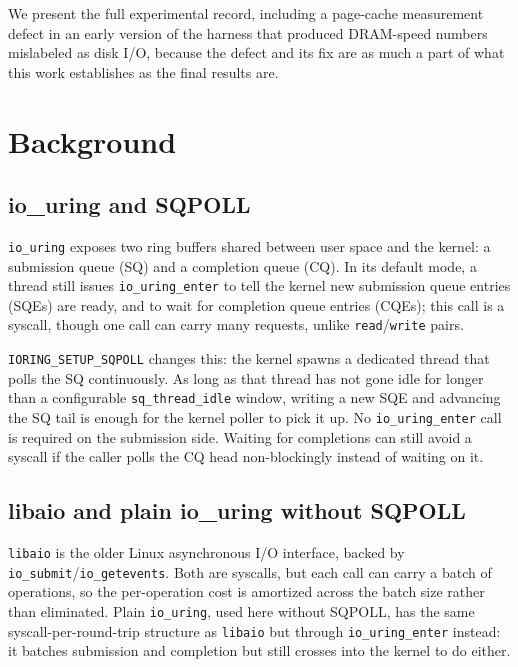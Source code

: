 \documentclass[conference]{IEEEtran}
\begin{document}
We present the full experimental record, including a page-cache measurement defect in an early
version of the harness that produced DRAM-speed numbers mislabeled as disk I/O, because the
defect and its fix are as much a part of what this work establishes as the final results are.

\section{Background}

\subsection{io\_uring and SQPOLL}

\texttt{io\_uring} exposes two ring buffers shared between user space and the kernel: a
submission queue (SQ) and a completion queue (CQ). In its default mode, a thread still issues
\texttt{io\_uring\_enter} to tell the kernel new submission queue entries (SQEs) are ready, and
to wait for completion queue entries (CQEs); this call is a syscall, though one call can carry
many requests, unlike \texttt{read}/\texttt{write} pairs.

\texttt{IORING\_SETUP\_SQPOLL} changes this: the kernel spawns a dedicated thread that polls the
SQ continuously. As long as that thread has not gone idle for longer than a configurable
\texttt{sq\_thread\_idle} window, writing a new SQE and advancing the SQ tail is enough for the
kernel poller to pick it up. No \texttt{io\_uring\_enter} call is required on the submission
side. Waiting for completions can still avoid a syscall if the caller polls the CQ head
non-blockingly instead of waiting on it.

\subsection{libaio and plain io\_uring without SQPOLL}

\texttt{libaio} is the older Linux asynchronous I/O interface, backed by
\texttt{io\_submit}/\texttt{io\_getevents}. Both are syscalls, but each call can carry a batch of
operations, so the per-operation cost is amortized across the batch size rather than eliminated.
Plain \texttt{io\_uring}, used here without SQPOLL, has the same syscall-per-round-trip structure
as \texttt{libaio} but through \texttt{io\_uring\_enter} instead: it batches submission and
completion but still crosses into the kernel to do either.
\end{document}
